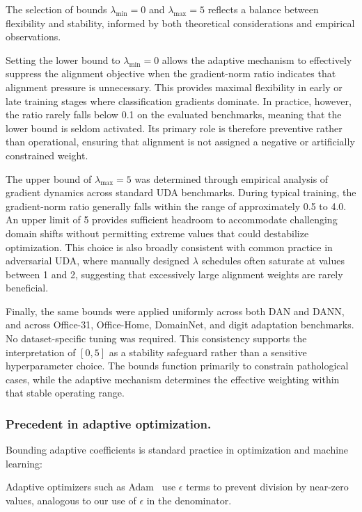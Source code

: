 \documentclass[pdflatex,sn-mathphys-num]{sn-jnl}
\theoremstyle{thmstyleone}
\theoremstyle{thmstyletwo}
\theoremstyle{thmstylethree}
\begin{document}
The selection of bounds $\lambda_{\min} = 0$ and $\lambda_{\max} = 5$ reflects a balance between flexibility and stability, informed by both theoretical considerations and empirical observations.

Setting the lower bound to $\lambda_{\min} = 0$ allows the adaptive mechanism to effectively suppress the alignment objective when the gradient-norm ratio indicates that alignment pressure is unnecessary. This provides maximal flexibility in early or late training stages where classification gradients dominate. In practice, however, the ratio rarely falls below 0.1 on the evaluated benchmarks, meaning that the lower bound is seldom activated. Its primary role is therefore preventive rather than operational, ensuring that alignment is not assigned a negative or artificially constrained weight.

The upper bound of $\lambda_{\max} = 5$ was determined through empirical analysis of gradient dynamics across standard UDA benchmarks. During typical training, the gradient-norm ratio generally falls within the range of approximately 0.5 to 4.0. An upper limit of 5 provides sufficient headroom to accommodate challenging domain shifts without permitting extreme values that could destabilize optimization. This choice is also broadly consistent with common practice in adversarial UDA, where manually designed $\lambda$ schedules often saturate at values between 1 and 2, suggesting that excessively large alignment weights are rarely beneficial.

Finally, the same bounds were applied uniformly across both DAN and DANN, and across Office-31, Office-Home, DomainNet, and digit adaptation benchmarks. No dataset-specific tuning was required. This consistency supports the interpretation of $[0, 5]$ as a stability safeguard rather than a sensitive hyperparameter choice. The bounds function primarily to constrain pathological cases, while the adaptive mechanism determines the effective weighting within that stable operating range.


\subsubsection{Precedent in adaptive optimization.}
Bounding adaptive coefficients is standard practice in optimization and machine learning:  

Adaptive optimizers such as Adam~\cite{kingma2015adam} use $\epsilon$ terms to prevent division by near-zero values, analogous to our use of $\epsilon$ in the denominator.  
\end{document}
